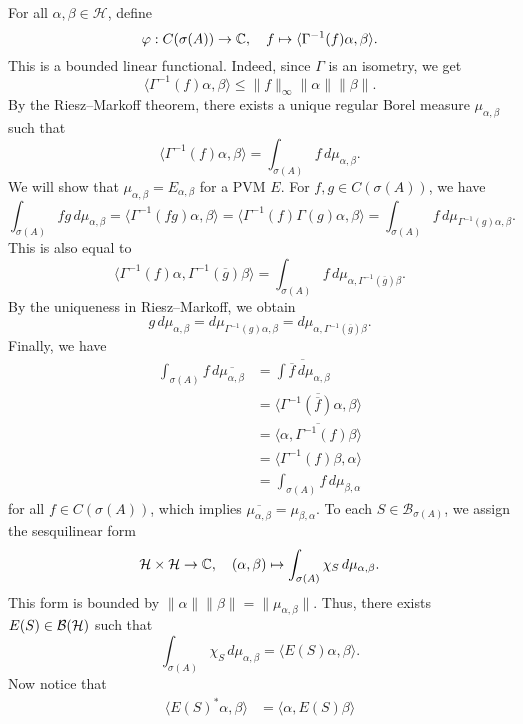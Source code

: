 \begin{myproof}
  For all $\alpha, \beta \in \mathcal{H}$, define
  $$\varphi: C(\sigma(A)) \to \mathbb {C},\quad f \mapsto \langle \Gamma^{-1} (f) \alpha, \beta\rangle.$$
  This is a bounded linear functional. Indeed, since $\Gamma$ is an isometry, we get
  $$\langle \Gamma^{-1} (f) \alpha, \beta\rangle \leq \| f\|_{\infty} \|\alpha\| \|\beta\|.$$
  By the Riesz--Markoff theorem, there exists a unique regular Borel measure $\mu_{\alpha, \beta}$ such that
  $$\langle \Gamma^{-1} (f) \alpha, \beta\rangle = \int_{\sigma(A)} f\, d\mu_{\alpha, \beta}.$$
  We will show that $\mu_{\alpha, \beta} = E_{\alpha, \beta}$ for a PVM $E$.
  For $f, g \in C(\sigma(A))$, we have 
  $$\int_{\sigma(A)} fg\, d\mu_{\alpha, \beta} = \langle \Gamma^{-1}(fg) \alpha, \beta\rangle = \langle \Gamma^{-1} (f) \Gamma(g) \alpha, \beta \rangle = \int_{\sigma(A)} f\, d\mu_{\Gamma^{-1} (g) \alpha, \beta}.$$
  This is also equal to 
  $$\langle \Gamma^{-1} (f) \alpha, \Gamma^{-1} (\overline{g}) \beta \rangle = \int_{\sigma(A)} f\, d\mu_{\alpha, \Gamma^{-1} (\overline{g}) \beta}.$$
  By the uniqueness in Riesz--Markoff, we obtain 
  $$g\, d{\mu_{\alpha, \beta}} = d\mu_{\Gamma^{-1} (g) \alpha, \beta} = d\mu_{\alpha, \Gamma^{-1}(\overline{g})\beta}.$$
  Finally, we have
  \begin{align*}
    \int_{\sigma(A)} f \, d\overline{\mu_{\alpha, \beta}} &= \overline{\int \overline{f}\, d\mu_{\alpha, \beta}}\\
    &= \overline{\langle \Gamma^{-1} (\overline{f}) \alpha, \beta \rangle}\\
    &= \overline{\langle \alpha, \Gamma^{-1} (f) \beta \rangle}\\
    &= \langle \Gamma^{-1} (f) \beta, \alpha\rangle\\
    &= \int_{\sigma(A)} f\, d\mu_{\beta, \alpha}
  \end{align*}
  for all $f \in C(\sigma(A))$, which implies $\overline{\mu_{\alpha, \beta}} = \mu_{\beta, \alpha}$. 
  To each $S \in \mathcal{B}_{\sigma(A)}$, we assign the sesquilinear form 
  $$\mathcal{H} \times \mathcal{H} \to \mathbb {C},\quad (\alpha, \beta) \mapsto \int_{\sigma(A)} \chi_S \, d\mu_{\alpha, \beta}.$$
  This form is bounded by $\|\alpha\| \|\beta\| = \|\mu_{\alpha, \beta}\|$.
  Thus, there exists $E(S) \in \operatorname{\mathcal{B} (\mathcal{H})}$ such that 
  $$\int_{\sigma(A)}\chi_S \, d\mu_{\alpha, \beta} = \langle E(S) \alpha, \beta\rangle.$$
  Now notice that 
  \begin{align*}
    \langle E(S)^* \alpha, \beta \rangle &= \langle \alpha, E(S) \beta\rangle\\

\end{align*}
\end{myproof}
